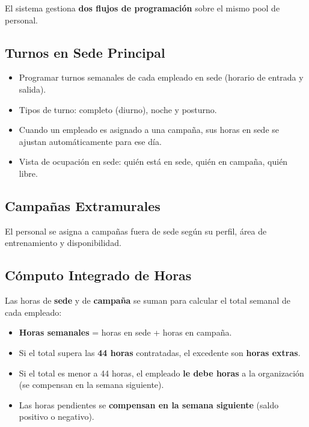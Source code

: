 \documentclass[9pt,a4paper]{extarticle}
\begin{document}
El sistema gestiona \textbf{dos flujos de programaci\'{o}n} sobre el mismo pool de personal.

\subsection{Turnos en Sede Principal}

\begin{itemize}[leftmargin=2em]
    \item Programar turnos semanales de cada empleado en sede (horario de entrada y salida).
    \item Tipos de turno: completo (diurno), noche y posturno.
    \item Cuando un empleado es asignado a una campaña, sus horas en sede se ajustan autom\'{a}ticamente para ese d\'{i}a.
    \item Vista de ocupaci\'{o}n en sede: qui\'{e}n est\'{a} en sede, qui\'{e}n en campaña, qui\'{e}n libre.
\end{itemize}

\subsection{Campañas Extramurales}

El personal se asigna a campañas fuera de sede seg\'{u}n su perfil, \'{a}rea de entrenamiento y disponibilidad.

\subsection{C\'{o}mputo Integrado de Horas}

Las horas de \textbf{sede} y de \textbf{campaña} se suman para calcular el total semanal de cada empleado:

\begin{itemize}[leftmargin=2em]
    \item \textbf{Horas semanales} = horas en sede + horas en campaña.
    \item Si el total supera las \textbf{44 horas} contratadas, el excedente son \textbf{horas extras}.
    \item Si el total es menor a 44 horas, el empleado \textbf{le debe horas} a la organizaci\'{o}n (se compensan en la semana siguiente).
    \item Las horas pendientes se \textbf{compensan en la semana siguiente} (saldo positivo o negativo).
\end{itemize}
\end{document}
